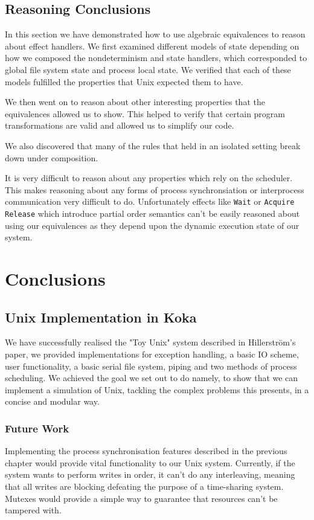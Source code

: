 \documentclass[logo,bsc,singlespacing,parskip]{infthesis}
\begin{document}
\section{Reasoning Conclusions}

In this section we have demonstrated how to use algebraic equivalences to reason about effect handlers. We first examined different models of state depending on how we composed the nondeterminism and state handlers, which corresponded to global file system state and process local state. We verified that each of these models fulfilled the properties that Unix expected them to have. 

We then went on to reason about other interesting properties that the equivalences allowed us to show. This helped to verify that certain program transformations are valid and allowed us to simplify our code. 

We also discovered that many of the rules that held in an isolated setting break down under composition. 

It is very difficult to reason about any properties which rely on the scheduler. This makes reasoning about any forms of process synchronsiation or interprocess communication very difficult to do. Unfortunately effects like \lstinline{Wait} or \lstinline{Acquire} \lstinline{Release} which introduce partial order semantics can't be easily reasoned about using our equivalences as they depend upon the dynamic execution state of our system.

\chapter{Conclusions}

\section{Unix Implementation in Koka}
We have successfully realised the "Toy Unix" system described in Hillerström's paper, we provided implementations for exception handling, a basic IO scheme, user functionality, a basic serial file system, piping and two methods of process scheduling. We achieved the goal we set out to do namely, to show that we can implement a simulation of Unix, tackling the complex problems this presents, in a concise and modular way.

\subsection*{Future Work}
Implementing the process synchronisation features described in the previous chapter would provide vital functionality to our Unix system. Currently, if the system wants to perform writes in order, it can't do any interleaving, meaning that all writes are blocking defeating the purpose of a time-sharing system. Mutexes would provide a simple way to guarantee that resources can't be tampered with.
\end{document}
